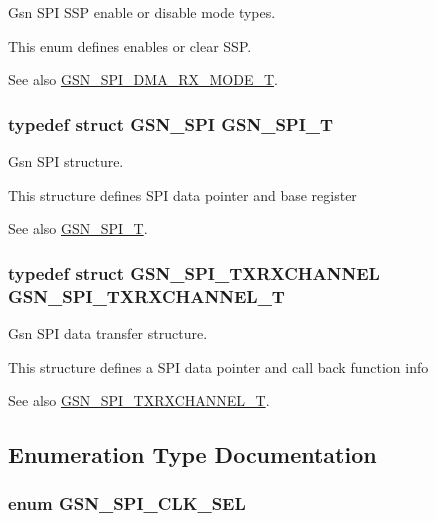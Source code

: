 Gsn SPI SSP enable or disable mode types. 

This enum defines enables or clear SSP. \begin{DoxySeeAlso}{See also}
\hyperlink{a00655_ga884b22be3cf70e4b96a0cda9b704390a}{GSN\_\-SPI\_\-DMA\_\-RX\_\-MODE\_\-T}. 
\end{DoxySeeAlso}
\hypertarget{a00655_ga18a5a1252fa65289699c9caa71d05fca}{
\subsubsection[{GSN\_\-SPI\_\-T}]{\setlength{\rightskip}{0pt plus 5cm}typedef struct {\bf GSN\_\-SPI}  {\bf GSN\_\-SPI\_\-T}}}
\label{a00655_ga18a5a1252fa65289699c9caa71d05fca}


Gsn SPI structure. 

This structure defines SPI data pointer and base register

\begin{DoxySeeAlso}{See also}
\hyperlink{a00655_ga18a5a1252fa65289699c9caa71d05fca}{GSN\_\-SPI\_\-T}. 
\end{DoxySeeAlso}
\hypertarget{a00655_ga0cdbeb0b657e6192938aebc1aaf793de}{
\subsubsection[{GSN\_\-SPI\_\-TXRXCHANNEL\_\-T}]{\setlength{\rightskip}{0pt plus 5cm}typedef struct {\bf GSN\_\-SPI\_\-TXRXCHANNEL}  {\bf GSN\_\-SPI\_\-TXRXCHANNEL\_\-T}}}
\label{a00655_ga0cdbeb0b657e6192938aebc1aaf793de}


Gsn SPI data transfer structure. 

This structure defines a SPI data pointer and call back function info

\begin{DoxySeeAlso}{See also}
\hyperlink{a00655_ga0cdbeb0b657e6192938aebc1aaf793de}{GSN\_\-SPI\_\-TXRXCHANNEL\_\-T}. 
\end{DoxySeeAlso}


\subsection{Enumeration Type Documentation}
\hypertarget{a00655_ga26d561511c040815639b118310656f40}{
\subsubsection[{GSN\_\-SPI\_\-CLK\_\-SEL}]{\setlength{\rightskip}{0pt plus 5cm}enum {\bf GSN\_\-SPI\_\-CLK\_\-SEL}}}
\label{a00655_ga26d561511c040815639b118310656f40}


